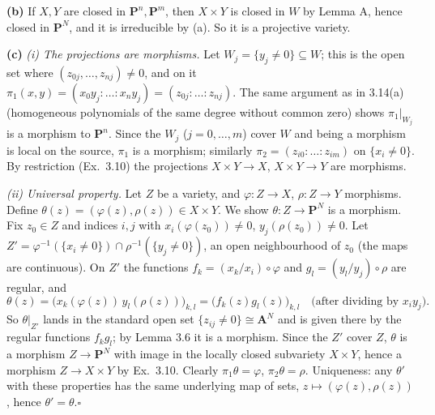 \documentclass[11pt]{article}
\begin{document}
\textbf{(b)} If $X,Y$ are closed in $\mathbf P^n,\mathbf P^m$, then $X\times Y$ is closed in $W$ by Lemma A, hence closed in $\mathbf P^N$, and it is irreducible by (a). So it is a projective variety.

\textbf{(c)} \emph{(i) The projections are morphisms.} Let $W_j=\{y_j\neq0\}\subseteq W$; this is the open set where $(z_{0j},\dots,z_{nj})\ne0$, and on it $\pi_1(x,y)=(x_0y_j:\dots:x_ny_j)=(z_{0j}:\dots:z_{nj})$. The same argument as in 3.14(a) (homogeneous polynomials of the same degree without common zero) shows $\pi_1|_{W_j}$ is a morphism to $\mathbf P^n$. Since the $W_j$ ($j=0,\dots,m$) cover $W$ and being a morphism is local on the source, $\pi_1$ is a morphism; similarly $\pi_2=(z_{i0}:\dots:z_{im})$ on $\{x_i\ne0\}$. By restriction (Ex.~3.10) the projections $X\times Y\to X$, $X\times Y\to Y$ are morphisms.

\emph{(ii) Universal property.} Let $Z$ be a variety, and $\varphi\colon Z\to X$, $\rho\colon Z\to Y$ morphisms. Define $\theta(z)=(\varphi(z),\rho(z))\in X\times Y$. We show $\theta\colon Z\to\mathbf P^N$ is a morphism. Fix $z_0\in Z$ and indices $i,j$ with $x_i(\varphi(z_0))\ne0$, $y_j(\rho(z_0))\neq0$. Let $Z'=\varphi^{-1}(\{x_i\ne0\})\cap\rho^{-1}(\{y_j\neq0\})$, an open neighbourhood of $z_0$ (the maps are continuous). On $Z'$ the functions $f_k=(x_k/x_i)\circ\varphi$ and $g_l=(y_l/y_j)\circ\rho$ are regular, and
\[
\theta(z)=\bigl(x_k(\varphi(z))\,y_l(\rho(z))\bigr)_{k,l}=\bigl(f_k(z)g_l(z)\bigr)_{k,l}\quad\text{(after dividing by }x_iy_j).
\]
So $\theta|_{Z'}$ lands in the standard open set $\{z_{ij}\neq0\}\cong\mathbf A^N$ and is given there by the regular functions $f_kg_l$; by Lemma 3.6 it is a morphism. Since the $Z'$ cover $Z$, $\theta$ is a morphism $Z\to\mathbf P^N$ with image in the locally closed subvariety $X\times Y$, hence a morphism $Z\to X\times Y$ by Ex.~3.10. Clearly $\pi_1\theta=\varphi$, $\pi_2\theta=\rho$. Uniqueness: any $\theta'$ with these properties has the same underlying map of sets, $z\mapsto(\varphi(z),\rho(z))$, hence $\theta'=\theta$.\hfill$\square$
\end{document}

